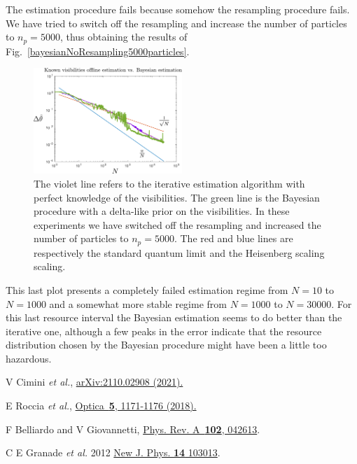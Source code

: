 \documentclass[aps, pra, 10pt, twocolumn, superscriptaddress,floatfix]{revtex4-1}
\begin{document}
%
The estimation procedure fails because somehow the resampling procedure fails. We have tried to switch off the resampling and increase the number of particles to $n_{p} = 5000$, thus obtaining the results of Fig.~\ref{bayesianNoResampling5000particles}.
%
\begin{figure}[!t]
	\begin{center}
		\includegraphics[width=0.5\textwidth]{bayesianNoResampling5000particles.pdf}
	\end{center}
	\caption{The violet line refers to the iterative estimation algorithm with perfect knowledge of the visibilities. The green line is the Bayesian procedure with a delta-like prior on the visibilities. In these experiments we have switched off the resampling and increased the number of particles to $n_p = 5000$. The red and blue lines are respectively the standard quantum limit and the Heisenberg scaling scaling.}
	\label{fig:bayesianNoResampling5000particles}
\end{figure}
%
This last plot presents a completely failed estimation regime from $N=10$ to $N=1000$ and a somewhat more stable regime from $N = 1000$ to $N=30000$. For this last resource interval the Bayesian estimation seems to do better than the iterative one, although a few peaks in the error indicate that the resource distribution chosen by the Bayesian procedure might have been a little too hazardous.  


\begin{thebibliography}{100}
	
		
	 V Cimini \textit{et al.}, \href{http://arxiv.org/abs/2110.02908}{arXiv:2110.02908 (2021).}
	
	 E Roccia \textit{et al.}, \href{https://www.osapublishing.org/optica/abstract.cfm?uri=optica-5-10-1171}{Optica~{\bf 5}, 1171-1176 (2018).}
		
	 F Belliardo and V Giovannetti, \href{https://link.aps.org/doi/10.1103/PhysRevA.102.042613}{Phys. Rev. A~{\bf 102}, 042613}.
	
	 C E Granade \textit{et al.} 2012 \href{https://doi.org/10.1088/1367-2630/14/10/103013}{New J. Phys. {\bf 14} 103013}.
	
\end{thebibliography}
\end{document}
